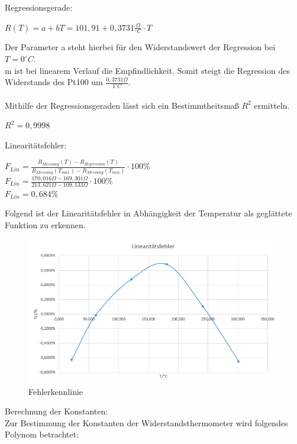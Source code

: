 \documentclass[a4paper,11pt,oneside]{article}
\begin{document}
Regressionsgerade:
\begin{center}
$R(T) = a + bT = 101,91 + 0,3731 \frac{\Omega}{{}^\circ C} \cdot T$
\end{center}
Der Parameter a steht hierbei für den Widerstandswert der Regression bei $T = 0^\circ C$. \\
m ist bei linearem Verlauf die Empfindlichkeit. Somit steigt die Regression des Widerstands des Pt100 um $\frac{0,3731 \Omega}{1 ^\circ C}$. 
\\\\
Mithilfe der Regressionsgeraden lässt sich ein Bestimmtheitsmaß $R^2$ ermitteln. 
\begin{center}
$R^2 = 0,9998$
\end{center}
Linearitätsfehler:
\begin{center}
$F_{Lin} = \frac{R_{Messung}(T) - R_{Regression}(T)}{R_{Messung}(T_{max}) - R_{Messung}(T_{min})}\cdot 100\%$\\
\vspace{0.5cm}
$F_{Lin} = \frac{170,016\Omega - 169,301 \Omega}{213,621\Omega - 109,133\Omega}\cdot 100\%$\\
\vspace{0.5cm}
$F_{Lin} = 0,684 \%$
\end{center}

Folgend ist der Linearitätsfehler in Abhängigkeit der Temperatur als geglättete Funktion zu erkennen.
\begin{figure}[h]
\centering
\includegraphics[scale=0.8]{Bilder/Aufg1Diagramm2Gegl.png}
\caption{Fehlerkennlinie}
\end{figure}

\newpage

Berechnung der Konstanten:\\
Zur Bestimmung der Konstanten der Widerstandsthermometer wird folgendes Polynom betrachtet:
\end{document}
